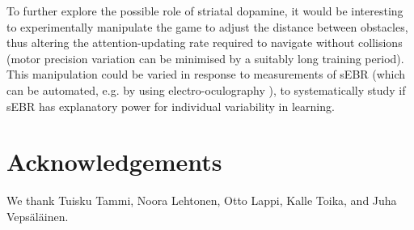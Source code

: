 \documentclass[10pt,letterpaper,floatsintext]{article}
\begin{document}
To further explore the possible role of striatal dopamine, it would be interesting to experimentally manipulate the game to adjust the distance between obstacles, thus altering the attention-updating rate required to navigate without collisions (motor precision variation can be minimised by a suitably long training period). This manipulation could be varied in response to measurements of sEBR (which can be automated, e.g. by using electro-oculography \cite{toivanen2014}), to systematically study if sEBR has explanatory power for individual variability in learning.





\section{Acknowledgements}
We thank Tuisku Tammi, Noora Lehtonen, Otto Lappi, Kalle Toika, and Juha Veps\"{a}l\"{a}inen.





\setlength{\bibleftmargin}{.125in}
\setlength{\bibindent}{-\bibleftmargin}


\end{document}

